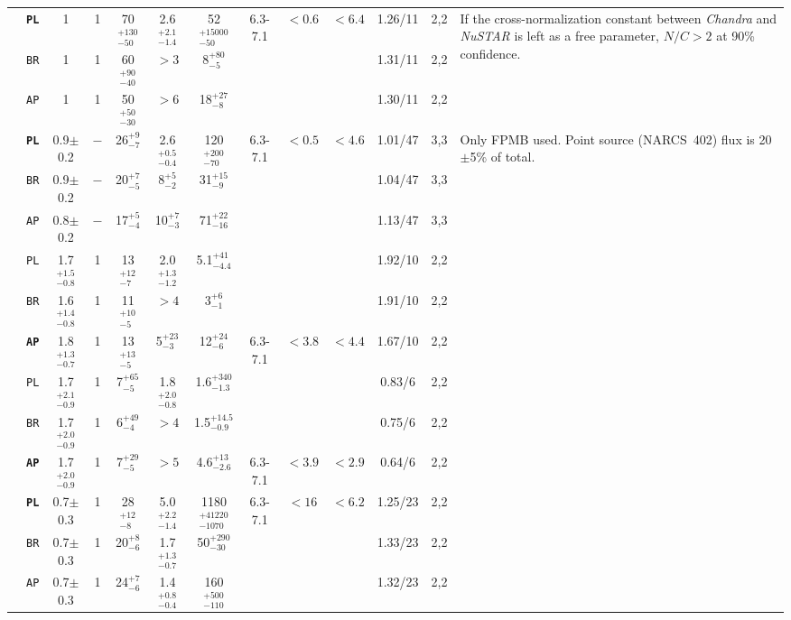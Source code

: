 \documentclass[iop,revtex4]{emulateapj}
\newcommand\M{\rule{0pt}{2.3ex}}
\newcommand\U{\rule{0pt}{3.2ex}}       %
\newcommand\D{\rule[-2.4ex]{0pt}{0pt}} %
\begin{document}
\begin{landscape}
\begin{longtable}{cp{0.6in}ccccccccccp{1.7in}}
\U\multirow{3}{*}{20}&\textbf{\texttt{PL}}&1&1&70$^{+130}_{-50}$&2.6$^{+2.1}_{-1.4}$&52$^{+15000}_{-50}$&6.3-7.1&$<0.6$&$<6.4$&1.26/11&2,2&\multirow{3}{1.7in}{If the cross-normalization constant between \textit{Chandra} and \textit{NuSTAR} is left as a free parameter, $N/C>2$ at 90\% confidence.}\\
\M&\texttt{BR}&1&1&60$^{+90}_{-40}$&$>3$&8$^{+80}_{-5}$&&&&1.31/11&2,2&\\
\M\D&\texttt{AP}&1&1&50$^{+50}_{-30}$&$>6$&18$^{+27}_{-8}$&&&&1.30/11&2,2&\\
\cline{13-13}

\U\multirow{3}{*}{21}&\textbf{\texttt{PL}}&0.9$\pm$0.2&$-$&26$^{+9}_{-7}$&2.6$^{+0.5}_{-0.4}$&120$^{+200}_{-70}$&6.3-7.1&$<0.5$&$<4.6$ &1.01/47&3,3&\multirow{3}{1.7in}{Only FPMB used. Point source (NARCS~402) flux is 20$\pm$5\% of total.}\\ 
\M&\texttt{BR}&0.9$\pm$0.2&$-$&20$^{+7}_{-5}$&8$^{+5}_{-2}$&31$^{+15}_{-9}$&&&&1.04/47&3,3&\\
\M\D&\texttt{AP}&0.8$\pm$0.2&$-$&17$^{+5}_{-4}$&10$^{+7}_{-3}$&71$^{+22}_{-16}$&&&&1.13/47&3,3&\\
\cline{13-13}

\U\multirow{3}{*}{22}&\texttt{PL}&1.7$^{+1.5}_{-0.8}$&1&13$^{+12}_{-7}$&2.0$^{+1.3}_{-1.2}$&5.1$^{+41}_{-4.4}$&&&&1.92/10&2,2&\\
\M&\texttt{BR}&1.6$^{+1.4}_{-0.8}$&1&11$^{+10}_{-5}$&$>4$&3$^{+6}_{-1}$&&&&1.91/10&2,2&\\
\M\D&\textbf{\texttt{AP}}&1.8$^{+1.3}_{-0.7}$&1&13$^{+13}_{-5}$&5$^{+23}_{-3}$&12$^{+24}_{-6}$&6.3-7.1&$<3.8$&$<4.4$&1.67/10&2,2&\\
\cline{13-13}


\U\multirow{3}{*}{23}&\texttt{PL}&1.7$^{+2.1}_{-0.9}$&1&7$^{+65}_{-5}$&1.8$^{+2.0}_{-0.8}$&1.6$^{+340}_{-1.3}$&&&&0.83/6&2,2&\\
\M&\texttt{BR}&1.7$^{+2.0}_{-0.9}$&1&6$^{+49}_{-4}$&$>4$&1.5$^{+14.5}_{-0.9}$&&&&0.75/6&2,2&\\
\M\D&\textbf{\texttt{AP}}&1.7$^{+2.0}_{-0.9}$&1&7$^{+29}_{-5}$&$>5$&4.6$^{+13}_{-2.6}$&6.3-7.1&$<3.9$&$<2.9$&0.64/6&2,2&\\
\cline{13-13}

\U\multirow{3}{*}{24}&\textbf{\texttt{PL}}&0.7$\pm$0.3&1&28$^{+12}_{-8}$&5.0$^{+2.2}_{-1.4}$&1180$^{+41220}_{-1070}$&6.3-7.1&$<16$&$<6.2$&1.25/23&2,2&\\
\M&\texttt{BR}&0.7$\pm$0.3&1&20$^{+8}_{-6}$&1.7$^{+1.3}_{-0.7}$&50$^{+290}_{-30}$&&&&1.33/23&2,2&\\
\M\D&\texttt{AP}&0.7$\pm$0.3&1&24$^{+7}_{-6}$&1.4$^{+0.8}_{-0.4}$&160$^{+500}_{-110}$&&&&1.32/23&2,2&\\
\cline{13-13}


\end{longtable}
\end{landscape}
\end{document}
